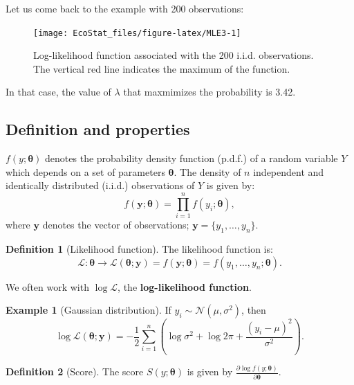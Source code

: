 \documentclass[
  12pt,
]{book}
\theoremstyle{definition}
\newtheorem{definition}{Definition}[chapter]
\theoremstyle{definition}
\newtheorem{example}{Example}[chapter]
\theoremstyle{definition}
\theoremstyle{definition}
\theoremstyle{remark}
\begin{document}
Let us come back to the example with 200 observations:

\begin{figure}
\texttt{[image: EcoStat\_files/figure-latex/MLE3-1]} \caption{Log-likelihood function associated with the 200 i.i.d. observations. The vertical red line indicates the maximum of the function.}\label{fig:MLE3}
\end{figure}

In that case, the value of \(\lambda\) that maxmimizes the probability is 3.42.

\hypertarget{definition-and-properties}{%
\subsection{Definition and properties}\label{definition-and-properties}}

\(f(y;\boldsymbol\theta)\) denotes the probability density function (p.d.f.) of a random variable \(Y\) which depends on a set of parameters \(\boldsymbol\theta\). The density of \(n\) independent and identically distributed (i.i.d.) observations of \(Y\) is given by:
\[
f(\mathbf{y};\boldsymbol\theta) = \prod_{i=1}^n f(y_i;\boldsymbol\theta),
\]
where \(\mathbf{y}\) denotes the vector of observations; \(\mathbf{y} = \{y_1,\dots,y_n\}\).

\begin{definition}[Likelihood function]
\protect\hypertarget{def:likelihood}{}\label{def:likelihood}The likelihood function is:
\[
\mathcal{L}: \boldsymbol\theta \rightarrow  \mathcal{L}(\boldsymbol\theta;\mathbf{y})=f(\mathbf{y};\boldsymbol\theta)=f(y_1,\dots,y_n;\boldsymbol\theta).
\]
\end{definition}

We often work with \(\log \mathcal{L}\), the \textbf{log-likelihood function}.

\begin{example}[Gaussian distribution]
\protect\hypertarget{exm:normal}{}\label{exm:normal}If \(y_i \sim \mathcal{N}(\mu,\sigma^2)\), then
\[
\log \mathcal{L}(\boldsymbol\theta;\mathbf{y}) = - \frac{1}{2}\sum_{i=1}^n\left( \log \sigma^2 + \log 2\pi + \frac{(y_i-\mu)^2}{\sigma^2} \right).
\]
\end{example}

\begin{definition}[Score]
\protect\hypertarget{def:score}{}\label{def:score}The score \(S(y;\boldsymbol\theta)\) is given by \(\frac{\partial \log f(y;\boldsymbol\theta)}{\partial \boldsymbol\theta}\).
\end{definition}
\end{document}
